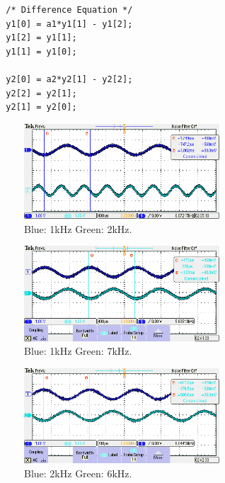 \documentclass{article}
\begin{document}
\begin{verbatim}
  /* Difference Equation */
  y1[0] = a1*y1[1] - y1[2];
  y1[2] = y1[1];
  y1[1] = y1[0];

  y2[0] = a2*y2[1] - y2[2];
  y2[2] = y2[1];
  y2[1] = y2[0];
\end{verbatim}

\begin{figure}[h]
  \begin{center}
    \includegraphics[width=0.65\textwidth]{img/task1.PNG}
    \caption{Blue: 1kHz Green: 2kHz.}
  \end{center}
\end{figure}

\begin{figure}[h]
  \begin{center}
    \includegraphics[width=0.65\textwidth]{img/task2.PNG}
    \caption{Blue: 1kHz Green: 7kHz.}
  \end{center}
\end{figure}

\begin{figure}[h]
  \begin{center}
    \includegraphics[width=0.65\textwidth]{img/task3.PNG}
    \caption{Blue: 2kHz Green: 6kHz.}
  \end{center}
\end{figure}
\end{document}
